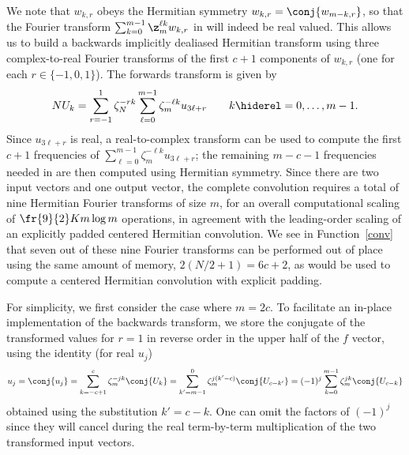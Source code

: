 \documentclass[final]{siamltex}
\def\bel{\begin{dmath}}
\def\eel{\end{dmath}}
\def\no{\hiderel}
\begin{document}
We note that $w_{k,r}$ obeys the Hermitian symmetry 
$w_{k,r}=\conj{w_{m-k,r}}$, so that the Fourier transform
$\sum_{k=0}^{m-1}\z_m^{\ell k} w_{k,r}$ in  will indeed
be real valued. This allows us to build a backwards implicitly dealiased
Hermitian transform using three complex-to-real Fourier transforms of the
first $c+1$ components of $w_{k,r}$ (one for each $r\in\{-1,0,1\}$). The
forwards transform is given by
\bel
NU_k
=\sum_{r=-1}^{1}\zeta_N^{-rk}\sum_{\ell=0}^{m-1}\zeta_m^{-\ell k} u_{3\ell+r}
\qquad k\no =0,\ldots,m-1.\label{fft0forwardsB}
\eel
Since $u_{3\ell+r}$ is real, a real-to-complex transform can be used to
compute the first $c+1$ frequencies of
$\sum_{\ell=0}^{m-1}\zeta_m^{-\ell k} u_{3\ell+r}$; the remaining $m-c-1$
frequencies needed in  are then computed using Hermitian
symmetry. Since there are two input vectors and
one output vector, the complete convolution requires a total of nine
Hermitian Fourier transforms of size $m$, for an overall computational
scaling of $\fr{9}{2}K m \log m$ operations, in agreement with the
leading-order scaling of an explicitly padded centered Hermitian convolution.
We see in Function~\ref{conv} that seven out of these nine Fourier
transforms can be performed out of place using the same amount of memory,
$2(N/2+1)=6c+2$, as would be used to compute a centered Hermitian convolution with
explicit padding.

For simplicity, we first consider the case where $m=2c$.
To facilitate an in-place implementation of the backwards transform, we
store the conjugate of the transformed values for $r=1$ in reverse order in
the upper half of the $f$ vector, using the identity (for real $u_j$)
$$
u_j=\conj{u_j}=\sum_{k=-c+1}^{c}\zeta_m^{-jk} \conj{U_k}
=\sum_{k'=m-1}^{0}\zeta_m^{j(k'-c)} \conj{U_{c-k'}}
=(-1)^j\sum_{k=0}^{m-1}\zeta_m^{jk} \conj{U_{c-k}}
$$
obtained using the substitution $k'=c-k$. One can omit the factors of
$(-1)^j$ since they will cancel during the real term-by-term multiplication
of the two transformed input vectors.
\end{document}

